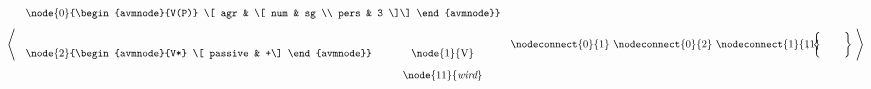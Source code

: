 \begin{math}\left <
\mbox{
\begin{tabular}{cc}
\multicolumn{2}{c}{\node{0}{\begin{avmnode}{V(P)}
\[ agr & \[ num & sg \\ pers & 3 \]\]
\end{avmnode}}} \\[6ex]
\node{2}{\begin{avmnode}{V*}
\[ passive & +\]
\end{avmnode}} & \node{1}{V} \\[2ex]
& \node{11}{{\it wird}}
\end{tabular}
\nodeconnect{0}{1}
\nodeconnect{0}{2}
\nodeconnect{1}{11}
\hspace{-2em} , %
$\left \{
\mbox{
\begin{tabular}{c}
~ \\ ~
\end{tabular}
}
\right \}$
}
\right >\end{math}


